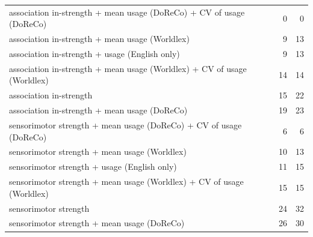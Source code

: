 \begin{table}[ht]
\begin{tabular}{lrr}
  association in-strength + mean usage (DoReCo) + CV of usage (DoReCo) & 0 & 0 \\ 
  association in-strength + mean usage (Worldlex) & 9 & 13 \\ 
  association in-strength + usage (English only) & 9 & 13 \\ 
  association in-strength + mean usage (Worldlex) + CV of usage (Worldlex) & 14 & 14 \\ 
  association in-strength & 15 & 22 \\ 
  association in-strength + mean usage (DoReCo) & 19 & 23 \\ 
  sensorimotor strength + mean usage (DoReCo) + CV of usage (DoReCo) & 6 & 6 \\ 
  sensorimotor strength + mean usage (Worldlex) & 10 & 13 \\ 
  sensorimotor strength + usage (English only) & 11 & 15 \\ 
  sensorimotor strength + mean usage (Worldlex) + CV of usage (Worldlex) & 15 & 15 \\ 
  sensorimotor strength & 24 & 32 \\ 
  sensorimotor strength + mean usage (DoReCo) & 26 & 30 \\ 
   \hline
\end{tabular}
\end{table}
